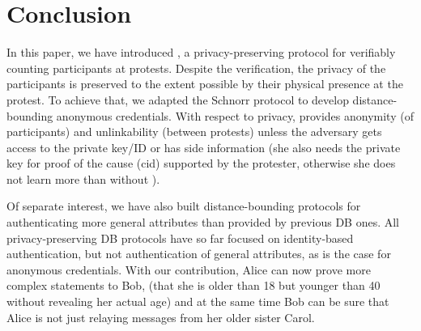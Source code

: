\section{Conclusion}%
\label{Conclusion}

In this paper, we have introduced \CROCUS, a privacy-preserving protocol for verifiably counting participants at protests. 
Despite the verification, the privacy of the participants is preserved to the extent possible by their physical presence at the protest. 
To achieve that, we adapted the Schnorr protocol to develop distance-bounding anonymous credentials. 
With respect to privacy, \CROCUS provides anonymity (of participants)  and unlinkability (between protests) unless the adversary gets access to the private key/ID or has side information (she also needs the private key for proof of the cause (cid) supported by the protester, otherwise she does not learn more than without \CROCUS).

Of separate interest, we have also built distance-bounding protocols for authenticating more general attributes than provided by previous \ac{DB} ones.
All privacy-preserving \ac{DB} protocols have so far focused on identity-based authentication, but not authentication of general attributes, as is the case for anonymous credentials.
With our contribution, Alice can now prove more complex statements to Bob, (\eg  that she is older than 18 but younger than 40 without revealing her actual age) and at the same time Bob can be sure that Alice is not just relaying messages from her older sister Carol.

